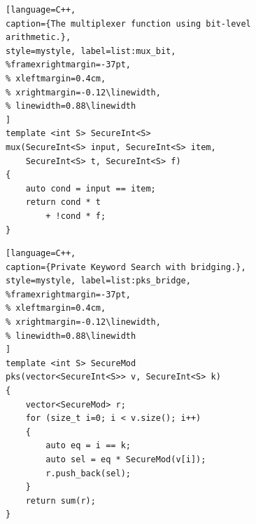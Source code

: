 \begin{figure}[t]
\begin{minipage}{\linewidth}
\begin{lstlisting}[language=C++,
caption={The multiplexer function using bit-level arithmetic.},
style=mystyle, label=list:mux_bit,
%framexrightmargin=-37pt,
% xleftmargin=0.4cm,
% xrightmargin=-0.12\linewidth,
% linewidth=0.88\linewidth
]
template <int S> SecureInt<S>
mux(SecureInt<S> input, SecureInt<S> item,
    SecureInt<S> t, SecureInt<S> f)
{
    auto cond = input == item;
    return cond * t
        + !cond * f;
}
\end{lstlisting}
\end{minipage}
\end{figure}

\begin{figure}[h]
\noindent\begin{minipage}{.50\textwidth}
\begin{lstlisting}[language=C++,
caption={Private Keyword Search with bridging.},
style=mystyle, label=list:pks_bridge,
%framexrightmargin=-37pt,
% xleftmargin=0.4cm,
% xrightmargin=-0.12\linewidth,
% linewidth=0.88\linewidth
]
template <int S> SecureMod
pks(vector<SecureInt<S>> v, SecureInt<S> k)
{
    vector<SecureMod> r;
    for (size_t i=0; i < v.size(); i++)
    {
        auto eq = i == k;
        auto sel = eq * SecureMod(v[i]);
        r.push_back(sel);
    }
    return sum(r);
}
\end{lstlisting}
\end{minipage}
\end{figure}



